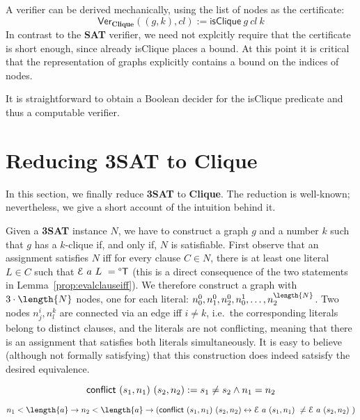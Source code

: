 \documentclass[a4paper,UKenglish,cleveref, autoref]{lipics-v2019}
\begin{document}
A verifier can be derived mechanically, using the list of nodes as the certificate:
\[\textsf{Ver}_{\textbf{Clique}} ((g, k), cl) := \textsf{isClique}~g~cl~k \]
In contrast to the \textbf{SAT} verifier, we need not explcitly require that the certificate is short enough, since already \textsf{isClique} places a bound. At this point it is critical that the representation of graphs explicitly contains a bound on the indices of nodes.

It is straightforward to obtain a Boolean decider for the \textsf{isClique} predicate and thus a computable verifier.

\section{Reducing \textbf{3SAT} to \textbf{Clique}}
In this section, we finally reduce \textbf{3SAT} to \textbf{Clique}. The reduction is well-known; nevertheless, we give a short account of the intuition behind it. 

Given a \textbf{3SAT} instance $N$, we have to construct a graph $g$ and a number $k$ such that $g$ has a $k$-clique if, and only if, $N$ is satisfiable. First observe that an assignment satisfies $N$ iff for every clause $C \in N$, there is at least one literal $L \in C$ such that $\mathcal{E}~a~L~ = \degree\mathsf{T}$ (this is a direct consequence of the two statements in Lemma~\ref{prop:evalclauseiff}). 
We therefore construct a graph with $3 \cdot \length{N}$ nodes, one for each literal: $n^0_0, n^0_1, n^0_2, n^1_0, \ldots, n^{\length{N}}_2$. Two nodes $n^i_j, n^k_l$ are connected via an edge iff $i \neq k$, i.e.\ the corresponding literals belong to distinct clauses, and the literals are not conflicting, meaning that there is an assignment that satisfies both literals simultaneously.
It is easy to believe (although not formally satisfying) that this construction does indeed satsisfy the desired equivalence. 

\begin{definition}
  \[\normalfont\textsf{conflict}~(s_1, n_1)~(s_2, n_2) := s_1 \neq s_2 \land n_1 = n_2 \]
\end{definition}
\begin{proposition}\label{prop:conflictingassgn}
  \[n_1 < \length{a} \rightarrow n_2 < \length{a} \rightarrow (\normalfont\textsf{conflict}~(s_1, n_1)~(s_2, n_2) \leftrightarrow \eval{a}{(s_1, n_1)} \neq \eval{a}{(s_2, n_2)}) \]
\end{proposition}
\end{document}
